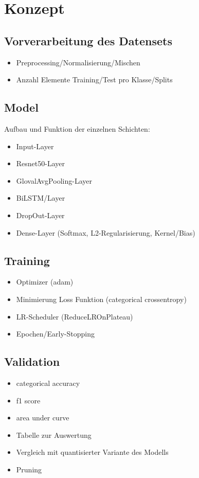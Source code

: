 \documentclass{article}
\begin{document}
    \newpage
    \section{Konzept}
    \subsection{Vorverarbeitung des Datensets}
    \begin{itemize}
        \item Preprocessing/Normalisierung/Mischen
        \item Anzahl Elemente Training/Test pro Klasse/Splits
    \end{itemize}
    \subsection{Model}
    Aufbau und Funktion der einzelnen Schichten:
    \begin{itemize}
        \item Input-Layer
        \item Resnet50-Layer
        \item GlovalAvgPooling-Layer
        \item BiLSTM/Layer
        \item DropOut-Layer
        \item Dense-Layer (Softmax, L2-Regularisierung, Kernel/Bias)
    \end{itemize}
    \subsection{Training}
    \begin{itemize}
        \item Optimizer (adam)
        \item Minimierung Loss Funktion (categorical crossentropy)
        \item LR-Scheduler (ReduceLROnPlateau)
        \item Epochen/Early-Stopping
    \end{itemize}
    \subsection{Validation}
    \begin{itemize}
        \item categorical accuracy
        \item f1 score
        \item area under curve
        \item Tabelle zur Auswertung
        \item Vergleich mit quantisierter Variante des Modells %
        \item Pruning %
    \end{itemize}
\end{document}
